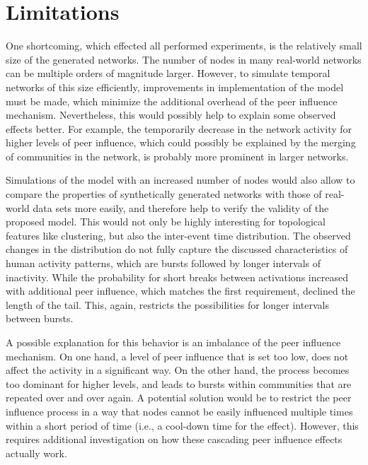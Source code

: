 

\section{Limitations}
\label{sec:limitations}

One shortcoming, which effected all performed experiments, is the relatively small size of the generated networks.
The number of nodes in many real-world networks can be multiple orders of magnitude larger.
However, to simulate temporal networks of this size efficiently, improvements in implementation of the model must be made, which minimize the additional overhead of the peer influence mechanism.
Nevertheless, this would possibly help to explain some observed effects better.
For example, the temporarily decrease in the network activity for higher levels of peer influence, which could possibly be explained by the merging of communities in the network, is probably more prominent in larger networks.

Simulations of the model with an increased number of nodes would also allow to compare the properties of synthetically generated networks with those of real-world data sets more easily, and therefore help to verify the validity of the proposed model.
This would not only be highly interesting for topological features like clustering, but also the inter-event time distribution.
The observed changes in the distribution do not fully capture the discussed characteristics of human activity patterns, which are bursts followed by longer intervals of inactivity.
While the probability for short breaks between activations increased with additional peer influence, which matches the first requirement, declined the length of the tail.
This, again, restricts the possibilities for longer intervals between bursts.

A possible explanation for this behavior is an imbalance of the peer influence mechanism.
On one hand, a level of peer influence that is set too low, does not affect the activity in a significant way.
On the other hand, the process becomes too dominant for higher levels, and leads to bursts within communities that are repeated over and over again.
A potential solution would be to restrict the peer influence process in a way that nodes cannot be easily influenced multiple times within a short period of time (i.e., a cool-down time for the effect).
However, this requires additional investigation on how these cascading peer influence effects actually work.


